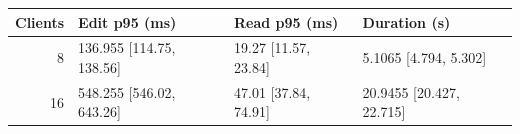 \begin{tabular}{rlll}
\hline
Clients & Edit p95 (ms) & Read p95 (ms) & Duration (s) \\
\hline
8 & 136.955 [114.75, 138.56] & 19.27 [11.57, 23.84] & 5.1065 [4.794, 5.302] \\
16 & 548.255 [546.02, 643.26] & 47.01 [37.84, 74.91] & 20.9455 [20.427, 22.715] \\
\hline
\end{tabular}
